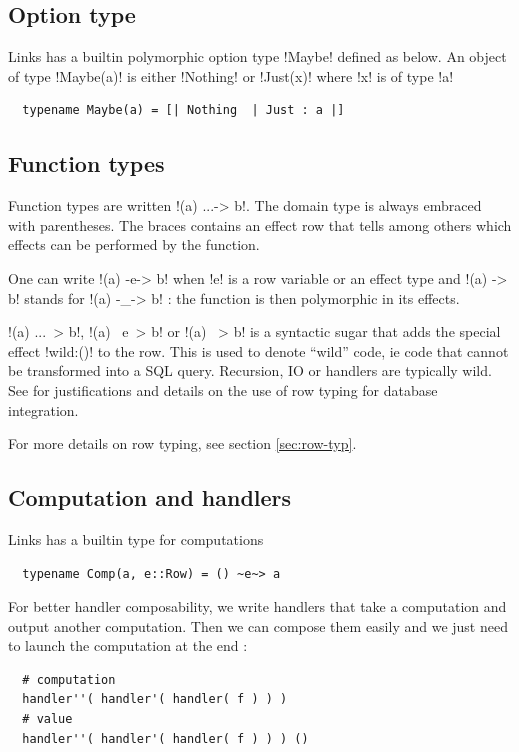 \documentclass[11pt, nonacm=true, language=french, language=english]{acmart}
\begin{document}
\subsection{Option type}
\label{sec:tech:maybe}
Links has a builtin polymorphic option type !Maybe! defined as below. An object of type !Maybe(a)! is either !Nothing! or !Just(x)! where !x! is of type !a!
\begin{lstlisting}
  typename Maybe(a) = [| Nothing  | Just : a |]
\end{lstlisting}

\subsection{Function types}
Function types are written !(a) {...}-> b!. The domain type is always embraced with parentheses. The braces contains an effect row that tells among others which effects can be performed by the function.

One can write !(a) -e-> b! when !e! is a row variable or an effect type and !(a) -> b! stands for !(a) -_-> b! : the function is then polymorphic in its effects.

!(a) {...}~> b!, !(a) ~e~> b! or !(a) ~> b! is a syntactic sugar that adds the special effect !wild:()! to the row. This is used to denote ``wild'' code, ie code that cannot be transformed into a SQL query. Recursion, IO or handlers are typically wild. See \citep{corelinks} for justifications and details on the use of row typing for database integration.

For more details on row typing, see section \ref{sec:row-typ}.

\subsection{Computation and handlers}
\label{sec:computation-handlers}
Links has a builtin type for computations
\begin{lstlisting}
  typename Comp(a, e::Row) = () ~e~> a
\end{lstlisting}

For better handler composability, we write handlers that take a computation and output another computation. Then we can compose them easily and we just need to launch the computation at the end :
\begin{lstlisting}
  # computation
  handler''( handler'( handler( f ) ) )
  # value
  handler''( handler'( handler( f ) ) ) ()
\end{lstlisting}
\end{document}
